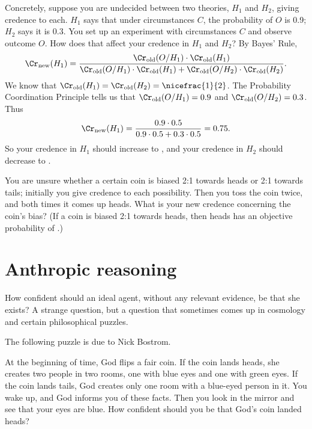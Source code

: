 Concretely, suppose you are undecided between two theories, $H_1$ and
$H_2$, giving credence  to each. $H_1$ says that under
circumstances $C$, the probability of $O$ is 0.9; $H_2$ says it is
0.3. You set up an experiment with circumstances $C$ and observe
outcome $O$. How does that affect your credence in $H_1$ and $H_2$? By
Bayes' Rule,
\[
\Cr_{\text{new}}(H_1) = \frac{\Cr_{\text{old}}(O/H_1) \cdot
  \Cr_{\text{old}}(H_1)}{\Cr_\text{old}(O/H_1)\cdot \Cr_\text{old}(H_1) +
  \Cr_\text{old}(O/H_2)\cdot \Cr_\text{old}(H_2)}.
\]
We know that $\Cr_\text{old}(H_1) = \Cr_\text{old}(H_2) =
\nicefrac{1}{2}$. The Probability Coordination Principle tells us that
$\Cr_{\text{old}}(O/H_1) = 0.9$ and $\Cr_{\text{old}}(O/H_2) = 0.3$. Thus 
\[
\Cr_{\text{new}}(H_1) = \frac{0.9 \cdot 0.5}{0.9 \cdot 0.5 + 0.3 \cdot 0.5} = 0.75.
\]
So your credence in $H_1$ should increase to , and your
credence in $H_2$ should decrease to .



\begin{exercise}{2}
  You are unsure whether a certain coin is biased 2:1 towards heads or
  2:1 towards tails; initially you give credence  to
  each possibility. Then you toss the coin twice, and both times it
  comes up heads. What is your new credence concerning the coin's
  bias? (If a coin is biased 2:1 towards heads, then heads has an
  objective probability of .) 
\end{exercise}



\section{Anthropic reasoning}

How confident should an ideal agent, without any relevant evidence, be
that she exists? A strange question, but a question that sometimes comes
up in cosmology and certain philosophical puzzles. 

The following puzzle is due to Nick Bostrom.

\begin{example}\label{ex:godscoin}
  At the beginning of time, God flips a fair coin. If the coin lands
  heads, she creates two people in two rooms, one with blue eyes and
  one with green eyes. If the coin lands tails, God creates only one
  room with a blue-eyed person in it. You wake up, and God informs you
  of these facts. Then you look in the mirror and see that your eyes
  are blue. How confident should you be that God's coin landed heads?
\end{example}

